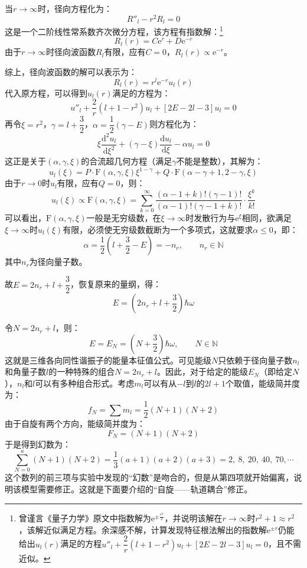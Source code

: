 \documentclass[a4paper,fontset=none]{ctexart}
\begin{document}
    \noindent 当$r \to \infty$时，径向方程化为：
    \[
    R''_l - r^2 R_l = 0
    \]
    这是一个二阶线性常系数齐次微分方程，该方程有指数解：\footnote{曾谨言《量子力学》原文中指数解为$\mathrm{e}^{\pm\tfrac{r^2}{2}}$，并说明该解在$r\to\infty$时$r^2 + 1 \approx r^2$，该解近似满足方程。余深感不解，计算发现特征根法解出的指数解$\mathrm{e}^{\pm r}$仍能给出$u_l(r)$满足的方程$u''_l + \dfrac{2}{r}(l+1-r^2)u_l + \left[2E - 2l - 3\right]u_l = 0$，且不需近似。}
    \[
    R_l(r) = C\mathrm{e}^r + D\mathrm{e}^{-r}
    \]
    由于$r \to \infty$时径向波函数$R_l$有限，应有$C = 0$，$R_l(r) \propto \mathrm{e}^{-r}$。

    综上，径向波函数的解可以表示为：
    \[
    R_l(r) = r^l\mathrm{e}^{-r}u_l(r)
    \]
    代入原方程，可以得到$u_l(r)$满足的方程为：
    \[
    u''_l + \frac{2}{r}(l+1-r^2)u_l + \left[2E - 2l - 3\right]u_l = 0
    \]
    再令$\xi = r^2$，$\gamma = l + \dfrac{3}{2}$，$\alpha = \dfrac{1}{2}\left(\gamma - E\right)$则方程化为：
    \[
    \xi\frac{\mathrm{d}^2 u_l}{\mathrm{d}\xi^2} + \left(\gamma-\xi\right)\frac{\mathrm{d} u_l}{\mathrm{d}\xi} - \alpha u_l = 0
    \]
    这正是关于$(\alpha,\gamma,\xi)$的合流超几何方程（满足$\gamma$不能是整数），其解为：
    \[
    u_l(\xi) = P \cdot \mathrm{F}(\alpha,\gamma,\xi) \xi^{1-\gamma} + Q \cdot \mathrm{F}(\alpha-\gamma+1,2-\gamma,\xi)
    \]
    由于$r \to 0$时$u_l$有限，应有$Q = 0$，则：
    \[
    u_l(\xi) \propto \mathrm{F}(\alpha,\gamma,\xi) = \sum_{k=0}^{\infty}\frac{(\alpha-1+k)!(\gamma-1)!}{(\alpha-1)!(\gamma-1+k)!}\cdot\frac{\xi^k}{k!}
    \]
    可以看出，$\mathrm{F}(\alpha,\gamma,\xi)$一般是无穷级数，在$\xi \to \infty$时发散行为与$\mathrm{e}^\xi$相同，欲满足$\xi \to \infty$时$u_l(\xi)$有限，必须使无穷级数截断为一个多项式，这就要求$\alpha \leqslant 0$，即：
    \[
    \alpha = \frac{1}{2}\left(l + \frac{3}{2} - E\right) = -n_r,\qquad n_r \in \mathbb{N}
    \]
    其中$n_r$为径向量子数。

    \noindent 故$E = 2n_r + l + \dfrac{3}{2}$，恢复原来的量纲，得：
    \[
    E = \left(2n_r + l + \dfrac{3}{2}\right)\hbar\omega
    \]

    令$N = 2n_r + l$，则：
    \[
    E = E_N = \left(N + \frac{3}{2}\right)\hbar\omega,\qquad N \in \mathbb{N}
    \]
    这就是三维各向同性谐振子的能量本征值公式。可见能级$N$只依赖于径向量子数$n_l$和角量子数$l$的一种特殊的组合$N=2n_r+l$。因此，对于给定的能级$E_N$（即给定$N$），$n_l$和$l$可以有多种组合形式。考虑$m_l$可以有从$-l$到$l$的$2l+1$个取值，能级简并度为：
    \[
    f_N = \sum m_l = \frac{1}{2}(N+1)(N+2)
    \]
    由于自旋有两个方向，能级简并度为：
    \[
    F_N = (N+1)(N+2)
    \]
    于是得到幻数为：
    \[
    \sum_{N=0}^a(N+1)(N+2) = \frac{1}{3}(a+1)(a+2)(a+3) = 2,\ 8,\ 20,\ 40,\ 70,\cdots
    \]
    这个数列的前三项与实验中发现的“幻数”是吻合的，但是从第四项就开始偏离，说明该模型需要修正。这就是下面要介绍的“自旋——轨道耦合”修正。
\end{document}
